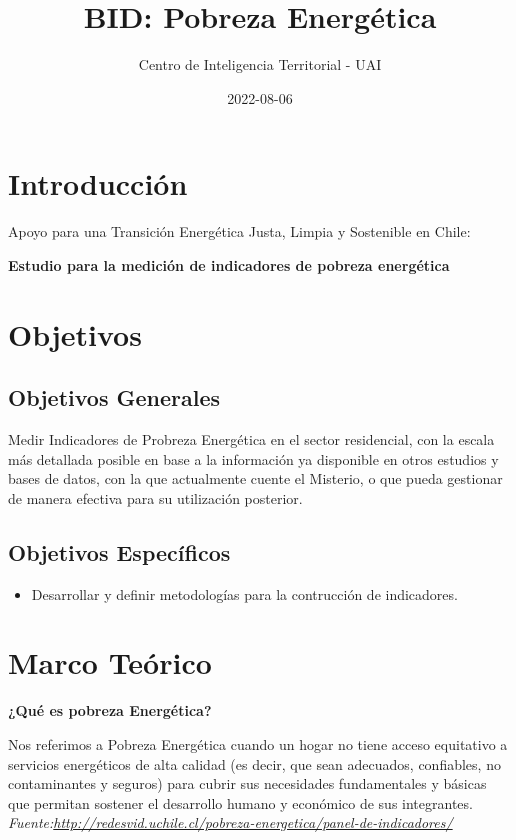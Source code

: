 \documentclass[
]{book}
\title{BID: Pobreza Energética}
\author{Centro de Inteligencia Territorial - UAI}
\date{2022-08-06}
\providecommand{\tightlist}{%
  \setlength{\itemsep}{0pt}\setlength{\parskip}{0pt}}
\begin{document}
\maketitle

{
\setcounter{tocdepth}{1}
\tableofcontents
}
\hypertarget{introducciuxf3n}{%
\chapter{Introducción}\label{introducciuxf3n}}

Apoyo para una Transición Energética Justa, Limpia y Sostenible en Chile:

\textbf{Estudio para la medición de indicadores de pobreza energética}

\hypertarget{objetivos}{%
\chapter{Objetivos}\label{objetivos}}

\hypertarget{objetivos-generales}{%
\section{Objetivos Generales}\label{objetivos-generales}}

Medir Indicadores de Probreza Energética en el sector residencial, con la escala más detallada posible en base a la información ya disponible en otros estudios y bases de datos, con la que actualmente cuente el Misterio, o que pueda gestionar de manera efectiva para su utilización posterior.

\hypertarget{objetivos-especuxedficos}{%
\section{Objetivos Específicos}\label{objetivos-especuxedficos}}

\begin{itemize}
\tightlist
\item
  Desarrollar y definir metodologías para la contrucción de indicadores.
\end{itemize}

\hypertarget{m_teorico}{%
\chapter{Marco Teórico}\label{m_teorico}}

\textbf{¿Qué es pobreza Energética?}

Nos referimos a Pobreza Energética cuando un hogar no tiene acceso equitativo a servicios energéticos de alta calidad (es decir, que sean adecuados, confiables, no contaminantes y seguros) para cubrir sus necesidades fundamentales y básicas que permitan sostener el desarrollo humano y económico de sus integrantes. \emph{Fuente:\url{http://redesvid.uchile.cl/pobreza-energetica/panel-de-indicadores/}}
\end{document}
